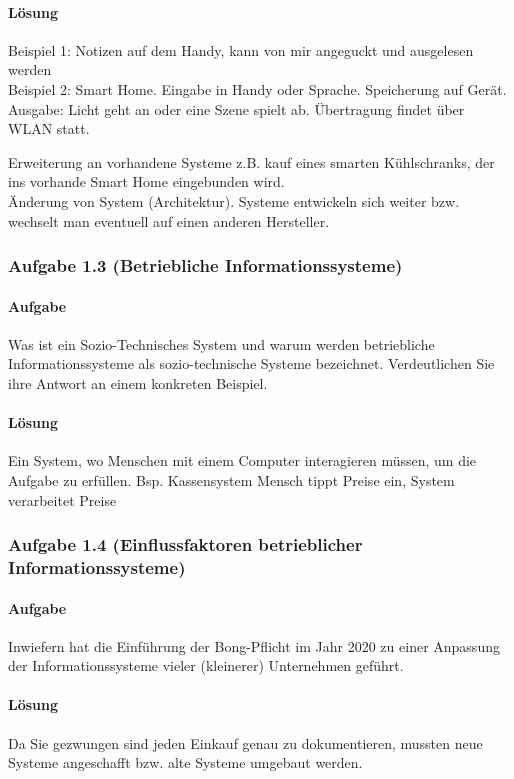 \paragraph*{Lösung}
    Beispiel 1: Notizen auf dem Handy, kann von mir angeguckt und ausgelesen werden \\
    Beispiel 2: Smart Home. Eingabe in Handy oder Sprache. Speicherung auf Gerät. Ausgabe: Licht geht an oder eine Szene spielt ab. Übertragung findet über WLAN statt. 
    
    Erweiterung an vorhandene Systeme z.B. kauf eines smarten Kühlschranks, der ins vorhande Smart Home eingebunden wird. \\
    Änderung von System (Architektur). Systeme entwickeln sich weiter bzw. wechselt man eventuell auf einen anderen Hersteller.

\subsubsection*{Aufgabe 1.3 (Betriebliche Informationssysteme)}
\paragraph*{Aufgabe}
    Was ist ein Sozio-Technisches System und warum werden betriebliche Informationssysteme als sozio-technische Systeme bezeichnet. Verdeutlichen Sie ihre Antwort an einem konkreten Beispiel.
\paragraph*{Lösung}
    Ein System, wo Menschen mit einem Computer interagieren müssen, um die Aufgabe zu erfüllen. Bsp. Kassensystem \textrightarrow Mensch tippt Preise ein, System verarbeitet Preise

\subsubsection*{Aufgabe 1.4 (Einflussfaktoren betrieblicher Informationssysteme)}
\paragraph*{Aufgabe}
    Inwiefern hat die Einführung der Bong-Pflicht im Jahr 2020 zu einer Anpassung der Informationssysteme vieler (kleinerer) Unternehmen geführt.
\paragraph*{Lösung}
    Da Sie gezwungen sind jeden Einkauf genau zu dokumentieren, mussten neue Systeme angeschafft bzw. alte Systeme umgebaut werden.


